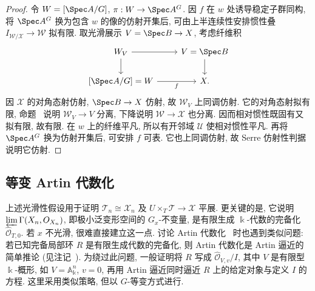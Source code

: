 \begin{proof}
令 $\mathcal W=[\Spec A/G]$, $\pi:\mathcal W\to\Spec A^G$. 因 $f$ 在 $w$ 处诱导稳定子群同构, 将 $\Spec A^G$ 换为包含 $w$ 的像的仿射开集后, 可由上半连续性安排惯性叠 $I_{\mathcal W/\mathcal X}\to\mathcal W$ 拟有限. 取光滑展示 $V=\Spec B\to\mathcal X$, 考虑纤维积
\begin{align*}
\begin{tikzcd}[ampersand replacement=\&]
\mathcal W_V\arrow[r]\arrow[d]\&V=\Spec B\arrow[d]\\
{[\Spec A/G]}=\mathcal W\arrow[r,"{f}"']\&\mathcal X.
\end{tikzcd}
\end{align*}
因 $\mathcal X$ 的对角态射仿射, $\Spec B\to\mathcal X$ 仿射, 故 $\mathcal W_V$ 上同调仿射. 它的对角态射拟有限, 命题~ 说明 $\mathcal W_V\to V$ 分离, 下降说明 $\mathcal W\to\mathcal X$ 也分离. 因而相对惯性既固有又拟有限, 故有限. 在 $w$ 上的纤维平凡, 所以有开邻域 $\mathcal U$ 使相对惯性平凡. 再将 $\Spec A^G$ 换为仿射开集后, 可安排 $f$ 可表. 它也上同调仿射, 故 Serre 仿射性判据~ 说明它仿射.
\end{proof}

\subsection{等变 Artin 代数化}\label{src:7.7.4-subsection}
上述光滑性假设用于证明 $\mathcal T_n\cong\mathcal X_n$ 及 $U\times_T\mathcal T\to\mathcal X$ 平展. 更关键的是, 它说明 $\varprojlim\Gamma(\mathcal X_n,\mathcal O_{\mathcal X_n})$, 即极小泛变形空间的 $G_x$-不变量, 是有限生成 $\Bbbk$-代数的完备化 $\widehat{\mathcal O}_{T,0}$. 若 $x$ 不光滑, 很难直接建立这一点. 讨论 Artin 代数化~ 时也遇到类似问题: 若已知完备局部环 $R$ 是有限生成代数的完备化, 则 Artin 代数化是 Artin 逼近的简单推论 (见注记~). 为绕过此问题, 一般证明将 $R$ 写成 $\widehat{\mathcal O}_{V,v}/I$, 其中 $V$ 是有限型 $\Bbbk$-概形, 如 $V=\mathbb A_{\Bbbk}^n$, $v=0$, 再用 Artin 逼近同时逼近 $R$ 上的给定对象与定义 $I$ 的方程. 这里采用类似策略, 但以 $G$-等变方式进行.

